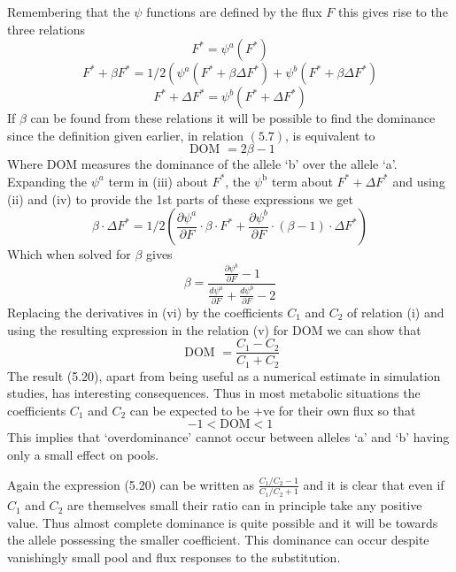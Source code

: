 Remembering that the $\psi$ functions are defined by the flux $F$ this gives rise to the three relations
%
\begin{equation}
F^{*}=\psi^{a}\left(F^{*}\right)  \tag{ii}
\label{eqn:520b}
\end{equation}
%
\begin{equation}
F^{*}+\beta F^{*} = 1/2\left(\psi^{a}\left(F^{*}+\beta \Delta F^{*}\right)+\psi^{b}\left(F^{*}+\beta \Delta F^{*}\right)\right. \tag{iii}
\label{eqn:520c}
\end{equation}
%
\begin{equation}
F^{*}+\Delta F^{*} = \psi^{b}\left(F^{*}+\Delta F^{*}\right) \tag{iv}
\label{eqn:520d}
\end{equation}
%
If $\beta$ can be found from these relations it will be possible to find the dominance since the definition given earlier, in relation $(5.7)$, is equivalent to
%
\begin{equation}
\text { DOM }=2 \beta-1  \tag{v}
\label{eqn:520e}
\end{equation}
%
Where DOM measures the dominance of the allele `b' over the allele `a'. Expanding the $\psi^{a}$ term in (iii) about $F^{*}$, the $\psi^{\text {b}}$ term about $F^{*}+\Delta F^{*}$ and using (ii) and (iv) to provide the 1st parts of these expressions we get
%
$$\beta \cdot \Delta F^{*}=1 / 2\left(\frac{\partial \psi^a}{\partial F} \cdot \beta \cdot F^{*}+\frac{\partial \psi^{b}}{\partial F} \cdot(\beta-1) \cdot \Delta F^{*}\right)$$
%
Which when solved for $\beta$ gives
%
\begin{equation}
\beta=\frac{\frac{\partial \psi^{b}}{\partial F}-1}{\frac{d \psi^{a}}{\partial F}+\frac{d \psi^{b}}{\partial F}-2} \tag{vi}
\label{eqn:520f}
\end{equation}
%
Replacing the derivatives in (vi) by the coefficients $C_{1}$ and $C_{2}$ of relation (i) and using the resulting expression in the relation (v) for DOM we can show that
%
\begin{equation}
\text { DOM }=\frac{C_{1} - C_{2}}{C_{1} + C_{2}}
\label{eqn:521}
\end{equation}
%
The result (5.20), apart from being useful as a numerical estimate in simulation studies, has interesting consequences. Thus in most metabolic situations the coefficients $C_{1}$ and $C_{2}$ can be expected to be +ve for their own flux so that
%
$$
-1 < \mathrm{DOM} < 1
$$
%
This implies that `overdominance' cannot occur between alleles `a' and `b' having only a small effect on pools.

Again the expression (5.20) can be written as $\frac{C_1 / C_2-1}{C_1 / C_2+1}$ and it is clear that even if $C_1$ and $C_2$ are themselves small their ratio can in principle take any positive value. Thus almost complete dominance is quite possible and it will be towards the allele possessing the smaller coefficient. This dominance can occur despite vanishingly small pool and flux responses to the substitution.

